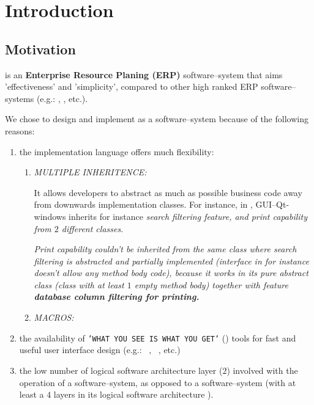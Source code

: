 \chapter{Introduction}

\section{Motivation}

\yerotherpblack is an \textbf{Enterprise Resource Planing (ERP)}
software--system that aims 'effectiveness' and 'simplicity',
compared to other high ranked ERP software--systems
(e.g.: \sageerp, \saperp, etc.).

We chose to design and implement \yerotherpblack as
a \thickclient software--system because of the
following reasons:

\begin{enumerate}[1.]

	\item the implementation language \cplusplus
		offers much flexibility:
		
		\begin{enumerate}[1.]
			\item \emph{MULTIPLE INHERITENCE:}
			
			It allows developers to abstract as much as possible
			business code away from downwards implementation
			classes. For instance,  in \yerotherpblack,
			GUI--Qt-windows inherits for instance
			\emph{search filtering feature, and print capability
			from $2$ different classes}.

			\emph{Print capability couldn't be inherited from the
			same class where search filtering is abstracted and
			partially implemented (interface in \Java for instance
			doesn't allow any method body code), because it works
			in its pure abstract class (\cplusplus class with at
			least $1$ empty method body) together with feature
			\textbf{database column filtering for printing.}}
			\newline
			
			\emph{}
		
			\item \emph{MACROS:}
		\end{enumerate}						
		
	\item the availability of \texttt{'WHAT YOU SEE IS WHAT YOU GET'}
		(\wy) tools for fast and useful
		user interface design (e.g.: \qtdesigner~\cite{qtdesigner:2020},
		\ministudio~\cite{miniStudio:2020}, etc.)
		
	\item the low number of logical software architecture
		layer ($2$) involved with the operation
		of a \thickclient software--system,	as opposed
		to a \webbrowserbased software--system
		(with at least a $4$ layers in its 
		logical software architecture ).
	
\end{enumerate}


